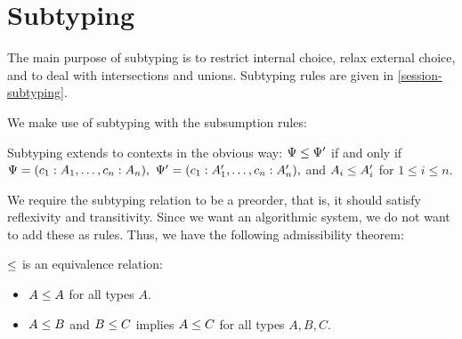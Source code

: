 
\section{Subtyping}

The main purpose of subtyping is to restrict internal choice, relax external choice, and to deal with intersections and unions. Subtyping rules are given in \cref{session-subtyping}.


We make use of subtyping with the subsumption rules:


Subtyping extends to contexts in the obvious way: $\Psi \le \Psi'$ if and only if $\Psi = (c_1 : A_1, \ldots, c_n : A_n),$ $\Psi' = (c_1 : A_1', \ldots, c_n : A_n'),$ and $A_i \le A_i'$ for $1 \le i \le n.$

We require the subtyping relation to be a preorder, that is, it should satisfy reflexivity and transitivity. Since we want an algorithmic system, we do not want to add these as rules. Thus, we have the following admissibility theorem:

\begin{theorem}
  $\le$ is an equivalence relation:
  \begin{itemize}
    \item $A \le A$ for all types $A.$
    \item $A \le B$ and $B \le C$ implies $A \le C$ for all types $A, B, C.$
  \end{itemize}
\end{theorem}

